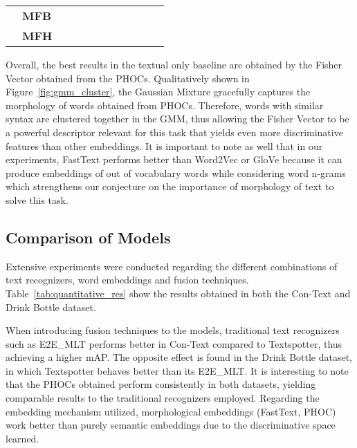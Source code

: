 \documentclass[10pt,twocolumn,letterpaper]{article}
\begin{document}
\begin{table*}[!tp]
\begin{center}
\begin{tabular}{c|l|l|l|l|l|l|l|l|l|l}
&\textbf{MFB~\cite{yu2017multi}}    &         &         &         &         &         &         &          &           &           \\
&\textbf{MFH~\cite{yu2018beyond}}    &         &         &         &         &         &         &          &           &  \\
\hline
\end{tabular}
\end{center}
\caption{ Results obtained by employing different fusion strategies on both the Con-Text and Drink Bottle dataset. For presentation purposes acronyms are used to represent each combination of text recognizers (Textspotter (T), E2E\_MLT (E), PHOC (P)) and word embeddings (Word2Vec (W), GloVe (G), FastText (F), Fisher Vector (FV)). The  refers to the proposed model.}
\label{tab:quantitative_res}
\end{table*}

Overall, the best results in the textual only baseline are obtained by the Fisher Vector obtained from the PHOCs.
Qualitatively shown in Figure~\ref{fig:gmm_cluster}, the Gaussian Mixture gracefully captures the morphology of words obtained from PHOCs. Therefore, words with similar syntax are clustered together in the GMM, thus allowing the Fisher Vector to be a powerful descriptor relevant for this task that yields even more discriminative features than other embeddings. It is important to note as well that in our experiments, FastText performs better than Word2Vec or GloVe because it can produce embeddings of out of vocabulary words while considering word n-grams 
which strengthens our conjecture on the importance of morphology of text to solve this task. 

\subsection{Comparison of Models}
Extensive experiments were conducted regarding the different combinations of text recognizers, word embeddings and fusion techniques. Table~\ref{tab:quantitative_res} show the results obtained in both the Con-Text and Drink Bottle dataset.

When introducing fusion techniques to the models, traditional text recognizers such as E2E\_MLT performs better in Con-Text compared to Textspotter, thus achieving a higher mAP. The opposite effect is found in the Drink Bottle dataset, in which Textspotter behaves better than its E2E\_MLT. It is interesting to note that the PHOCs obtained perform consistently in both datasets, yielding comparable results to the traditional recognizers employed.
Regarding the embedding mechanism utilized, morphological embeddings (FastText, PHOC) work better than purely semantic embeddings due to the discriminative space learned. 
\end{document}

